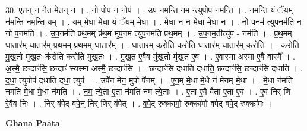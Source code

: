 \documentclass[17pt]{extarticle}
\begin{document}
30. ए॒तन् न नैत मे॒तन् न । . नो पोप॒ न नोप॑ । . उप॑ नमन्ति नम॒ न्त्युपोप॑ नमन्ति । . न॒म॒न्ति॒ यं ॅयम् न॑मन्ति नमन्ति॒ यम् । . यम् मे॒धा मे॒धा यं ॅयम् मे॒धा । . मे॒धा न न मे॒धा मे॒धा न । . नो प॒नम॑ त्युप॒नम॑ति॒ न नो प॒नम॑ति । . उ॒प॒नम॑ति प्रथ॒मम् प्र॑थ॒म मु॑प॒नम॑ त्युप॒नम॑ति प्रथ॒मम् । . उ॒प॒नम॒तीत्यु॑प - नम॑ति । . प्र॒थ॒मम् धा॒तार॑म् धा॒तार॑म् प्रथ॒मम् प्र॑थ॒मम् धा॒तार᳚म् । . धा॒तार॑म् करोति करोति धा॒तार॑म् धा॒तार॑म् करोति । . क॒रो॒ति॒ मु॒ख॒तो मु॑ख॒तः क॑रोति करोति मुख॒तः । . मु॒ख॒त ए॒वैव मु॑ख॒तो मु॑ख॒त ए॒व । . ए॒वास्मा॑ अस्मा ए॒वै वास्मै᳚ । . अ॒स्मै॒ छन्दाꣳ॑सि॒ छन्दाꣳ॑ स्यस्मा अस्मै॒ छन्दाꣳ॑सि । . छन्दाꣳ॑सि दधाति दधाति॒ छन्दाꣳ॑सि॒ छन्दाꣳ॑सि दधाति । . द॒धा॒ त्युपोप॑ दधाति दधा॒ त्युप॑ । . उपै॑न मेन॒ मुपो पै॑नम् । . ए॒न॒म् मे॒धा मे॒धै न॑ मेनम् मे॒धा । . मे॒धा न॑मति नमति मे॒धा मे॒धा न॑मति । . न॒म॒ त्ये॒ता ए॒ता न॑मति नम त्ये॒ताः । . ए॒ता ए॒वै वैता ए॒ता ए॒व । . ए॒व निर् णि रे॒वैव निः । . निर् व॑पेद् वपे॒न् निर् णिर् व॑पेत् । . व॒पे॒द् रुक्का॑मो॒ रुक्का॑मो वपेद् वपे॒द् रुक्का॑मः । \newline

\textbf{Ghana Paata } \newline
\end{document}
